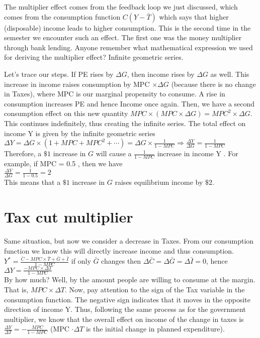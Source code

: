 \documentclass[10pt]{article}
\begin{document}
The multiplier effect comes from the feedback loop we just discussed, which comes from the consumption function $C(Y-\bar{T})$ which says that higher (disposable) income leads to higher consumption. This is the second time in the semester we encounter such an effect. The first one was the money multiplier through bank lending. Anyone remember what mathematical expression we used for deriving the multiplier effect? Infinite geometric series.

Let's trace our steps. If PE rises by $\Delta G$, then income rises by $\Delta G$ as well. This increase in income raises consumption by MPC $\times \Delta G$ (because there is no change in Taxes), where MPC is our marginal propensity to consume. A rise in consumption increases PE and hence Income once again. Then, we have a second consumption effect on this new quantity $M P C \times(M P C \times \Delta G)=M P C^{2} \times \Delta G$. This continues indefinitely, thus creating the infinite series. The total effect on income Y is given by the infinite geometric series\\
$\Delta Y=\Delta G \times\left(1+M P C+M P C^{2}+\cdots\right)=\Delta G \times \frac{1}{1-M P C} \Rightarrow \frac{\Delta Y}{\Delta G}=\frac{1}{1-M P C}$\\
Therefore, a $\$ 1$ increase in $G$ will cause a $\frac{1}{1-M P C}$ increase in income Y . For example, if MPC = 0.5 , then we have\\
$\frac{\Delta Y}{\Delta G}=\frac{1}{1-0.5}=2$\\
This means that a $\$ 1$ increase in $G$ raises equilibrium income by $\$ 2$.

\section*{Tax cut multiplier}
Same situation, but now we consider a decrease in Taxes. From our consumption function we know this will directly increase income and thus consumption.\\
$Y^{*}=\frac{\bar{C}-M P C \times \bar{T}+\bar{G}+\bar{I}}{1-M P C}$ if only $\bar{G}$ changes then $\Delta \bar{C}=\Delta \bar{G}=\Delta \bar{I}=0$, hence $\Delta Y=\frac{-M P C \times \Delta T}{1-M P C}$\\
By how much? Well, by the amount people are willing to consume at the margin. That is, $M P C \times \Delta T$. Now, pay attention to the sign of the Tax variable in the consumption function. The negative sign indicates that it moves in the opposite direction of income Y. Thus, following the same process as for the government multiplier, we know that the overall effect on income of the change in taxes is $\frac{\Delta Y}{\Delta T}=-\frac{M P C}{1-M P C}$ (MPC $\cdot \Delta T$ is the initial change in planned expenditure).
\end{document}
